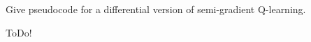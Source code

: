 
\begin{exercise}

Give pseudocode for a differential version of semi-gradient Q-learning.

\end{exercise}


\begin{solution}

ToDo!

\end{solution}

